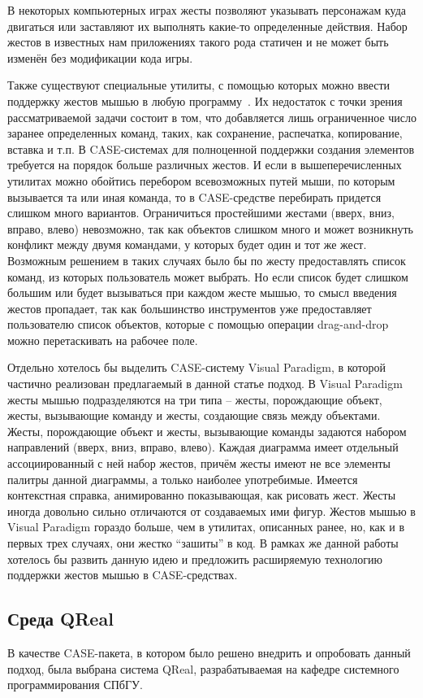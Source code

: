 \documentclass[a5paper]{article}
\begin{document}
В некоторых компьютерных играх жесты позволяют указывать персонажам куда двигаться или заставляют их выполнять какие-то определенные действия. Набор жестов в известных нам приложениях такого рода статичен и не может быть изменён без модификации кода игры.

Также существуют специальные утилиты, с помощью которых можно ввести поддержку жестов мышью в любую программу~\cite{strokeIt, gMote, xstroke, flyGesture}. Их недостаток с точки зрения рассматриваемой задачи состоит в том, что добавляется лишь ограниченное число заранее определенных команд, таких, как сохранение, распечатка, копирование, вставка и т.п. В CASE-системах для полноценной поддержки создания элементов требуется на порядок больше различных жестов. И если в вышеперечисленных утилитах можно обойтись перебором всевозможных путей мыши, по которым вызывается та или иная команда, то в CASE-средстве перебирать придется слишком много вариантов. Ограничиться простейшими жестами (вверх, вниз, вправо, влево) невозможно, так как объектов слишком много и может возникнуть конфликт между двумя командами, у которых будет один и тот же жест. Возможным решением в таких случаях было бы по жесту предоставлять список команд, из которых пользователь может выбрать. Но если список будет слишком большим или будет вызываться при каждом жесте мышью, то смысл введения жестов пропадает, так как большинство инструментов уже предоставляет пользователю список объектов, которые с помощью операции drag-and-drop можно перетаскивать на рабочее поле.

Отдельно хотелось бы выделить CASE-систему Visual Paradigm, в которой частично реализован предлагаемый в данной статье подход. В Visual Paradigm жесты мышью подразделяются на три типа – жесты, порождающие объект, жесты, вызывающие команду и жесты, создающие связь между объектами. Жесты, порождающие объект и жесты, вызывающие команды задаются набором направлений (вверх, вниз, вправо, влево). Каждая диаграмма имеет отдельный ассоциированный с ней набор жестов, причём жесты имеют не все элементы палитры данной диаграммы, а только наиболее употребимые. Имеется контекстная справка, анимированно показывающая, как рисовать жест. Жесты иногда довольно сильно отличаются от создаваемых ими фигур. Жестов мышью в Visual Paradigm гораздо больше, чем в  утилитах, описанных ранее, но, как и в первых трех случаях, они жестко ``зашиты'' в код. В рамках же данной работы хотелось бы развить данную идею и предложить расширяемую технологию поддержки жестов мышью в CASE-средствах.

\subsection{Среда QReal}
В качестве CASE-пакета, в котором было решено внедрить и опробовать данный подход, была выбрана система QReal, разрабатываемая на кафедре системного программирования СПбГУ. 
\end{document}
